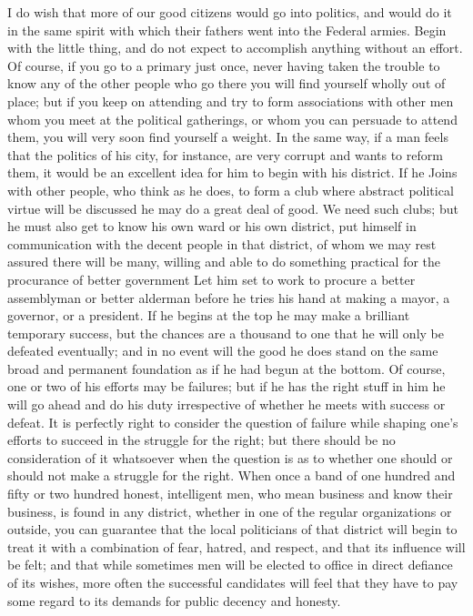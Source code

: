 \documentclass[a4paper]{amsbook}
\begin{document}
I do wish that more of our good citizens would go into politics, and would do it in the same spirit with which their fathers went into the Federal armies. Begin with the little thing, and do not expect to accomplish anything without an effort. Of course, if you go to a primary just once, never having taken the trouble to know any of the other people who go there you will find yourself wholly out of place; but if you keep on attending and try to form associations with other men whom you meet at the political gatherings, or whom you can persuade to attend them, you will very soon find yourself a weight. In the same way, if a man feels that the politics of his city, for instance, are very corrupt and wants to reform them, it would be an excellent idea for him to begin with his district. If he Joins with other people, who think as he does, to form a club where abstract political virtue will be discussed he may do a great deal of good. We need such clubs; but he must also get to know his own ward or his own district, put himself in communication with the decent people in that district, of whom we may rest assured there will be many, willing and able to do something practical for the procurance of better government Let him set to work to procure a better assemblyman or better alderman before he tries his hand at making a mayor, a governor, or a president. If he begins at the top he may make a brilliant temporary success, but the chances are a thousand to one that he will only be defeated eventually; and in no event will the good he does stand on the same broad and permanent foundation as if he had begun at the bottom. Of course, one or two of his efforts may be failures; but if he has the right stuff in him he will go ahead and do his duty irrespective of whether he meets with success or defeat. It is perfectly right to consider the question of failure while shaping one's efforts to succeed in the struggle for the right; but there should be no consideration of it whatsoever when the question is as to whether one should or should not make a struggle for the right. When once a band of one hundred and fifty or two hundred honest, intelligent men, who mean business and know their business, is found in any district, whether in one of the regular organizations or outside, you can guarantee that the local politicians of that district will begin to treat it with a combination of fear, hatred, and respect, and that its influence will be felt; and that while sometimes men will be elected to office in direct defiance of its wishes, more often the successful candidates will feel that they have to pay some regard to its demands for public decency and honesty.
\end{document}
